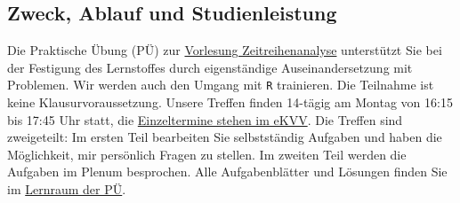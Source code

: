 
\ifcomment\else
\subsection*{Zweck, Ablauf und Studienleistung}

Die Praktische Übung (PÜ) zur \href{https://ekvv.uni-bielefeld.de/kvv_publ/publ/vd?id=389104149}{Vorlesung Zeitreihenanalyse} unterstützt Sie bei der Festigung des Lernstoffes durch eigenständige Auseinandersetzung mit Problemen. Wir werden auch den Umgang mit \texttt{R} trainieren. Die Teilnahme ist keine Klausurvoraussetzung. Unsere Treffen finden 14-tägig am Montag von 16:15 bis 17:45 Uhr statt, die \href{https://ekvv.uni-bielefeld.de/kvv_publ/publ/Veranstaltung_Termine.jsp?id=388066971}{Einzeltermine stehen im eKVV}. Die Treffen sind zweigeteilt: Im ersten Teil bearbeiten Sie selbstständig Aufgaben und haben die Möglichkeit, mir persönlich Fragen zu stellen. Im zweiten Teil werden die Aufgaben im Plenum besprochen. Alle Aufgabenblätter und Lösungen finden Sie im \href{https://moodle.uni-bielefeld.de/course/view.php?id=1035}{Lernraum der PÜ}. \\


